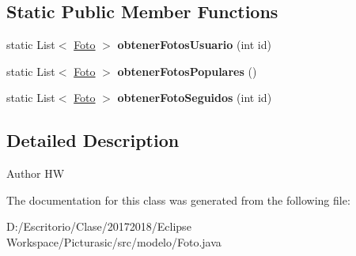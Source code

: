 \subsection*{Static Public Member Functions}
\begin{DoxyCompactItemize}
\item 
\mbox{\label{classmodelo_1_1_foto_adcf36212769d687253077abfe7ec718d}} 
static List$<$ \mbox{\hyperlink{classmodelo_1_1_foto}{Foto}} $>$ {\bfseries obtener\+Fotos\+Usuario} (int id)
\item 
\mbox{\label{classmodelo_1_1_foto_a09d5bb0737c55dc05004cf7e1c9d6095}} 
static List$<$ \mbox{\hyperlink{classmodelo_1_1_foto}{Foto}} $>$ {\bfseries obtener\+Fotos\+Populares} ()
\item 
\mbox{\label{classmodelo_1_1_foto_a6d2db8c4412bb95eb8c4b7c9e5849608}} 
static List$<$ \mbox{\hyperlink{classmodelo_1_1_foto}{Foto}} $>$ {\bfseries obtener\+Foto\+Seguidos} (int id)
\end{DoxyCompactItemize}


\subsection{Detailed Description}
\begin{DoxyAuthor}{Author}
HW 
\end{DoxyAuthor}


The documentation for this class was generated from the following file\+:\begin{DoxyCompactItemize}
\item 
D\+:/\+Escritorio/\+Clase/20172018/\+Eclipse Workspace/\+Picturasic/src/modelo/Foto.\+java\end{DoxyCompactItemize}
